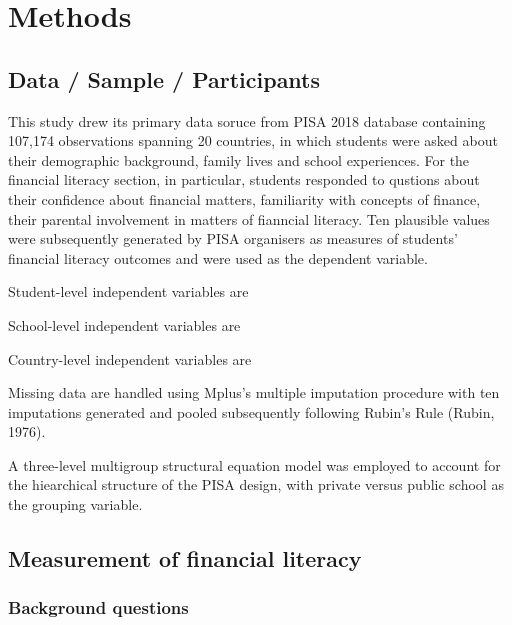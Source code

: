 \documentclass[a4paper,11pt,UKenglish,twoside,openright]{report}\usepackage[]{graphicx}\usepackage[]{color}
\begin{document}
\newpage



\newpage








\chapter{Methods}
\label{chp:3}

\section{Data / Sample / Participants}

This study drew its primary data soruce from PISA 2018 database \parencite{FLdata} containing 107,174 observations spanning 20 countries, in which students were asked about their demographic background, family lives and school experiences. For the financial literacy section, in particular, students responded to qustions about their confidence about financial matters, familiarity with concepts of finance, their parental involvement in matters of fianncial literacy. Ten plausible values were subsequently generated by PISA organisers as measures of students' financial literacy outcomes and were used as the dependent variable.

Student-level independent variables are

School-level independent variables are

Country-level independent variables are

Missing data are handled using Mplus's multiple imputation procedure with ten imputations generated and pooled subsequently following Rubin's Rule (Rubin, 1976).

A three-level multigroup structural equation model was employed to account for the hiearchical structure of the PISA design, with private versus public school as the grouping variable.

\section{Measurement of financial literacy}

\subsection{Background questions}
\end{document}
